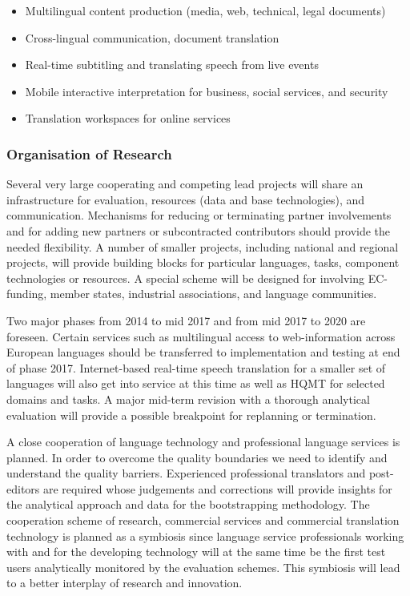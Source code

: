 \documentclass[10pt, plain]{../../metanetpaper}
\begin{document}
\begin{multicols}{2}
\begin{itemize}
\item Multilingual content production (media, web, technical, legal documents)
\item Cross-lingual communication, document translation
\item Real-time subtitling and translating speech from live events
\item Mobile interactive interpretation for business, social services, and security
\item Translation workspaces for online services
\end{itemize}

\subsubsection{Organisation of Research}
\label{sec:organ-rese-pt1}

Several very large cooperating and competing lead projects will share an infrastructure for evaluation, resources (data and base technologies), and communication. Mechanisms for reducing or terminating partner involvements and for adding new partners or subcontracted contributors should provide the needed flexibility. A number of smaller projects, including national and regional projects, will provide building blocks for particular languages, tasks, component technologies or resources. A special scheme will be designed for involving EC-funding, member states, industrial associations, and language communities.
 
Two major phases from 2014 to mid 2017 and from mid 2017 to 2020 are foreseen. Certain services such as multilingual access to web-information across European languages should be transferred to implementation and testing at end of phase 2017. Internet-based real-time speech translation for a smaller set of languages will also get into service at this time as well as HQMT for selected domains and tasks. A major mid-term revision with a thorough analytical evaluation will provide a possible breakpoint for replanning or termination.
 
A close cooperation of language technology and professional language services is planned. In order to overcome the quality boundaries we need to identify and understand the quality barriers. Experienced professional translators and post-editors are required whose judgements and corrections will provide insights for the analytical approach and data for the bootstrapping methodology. The cooperation scheme of research, commercial services and commercial translation technology is planned as a symbiosis since language service professionals working with and for the developing technology will at the same time be the first test users analytically monitored by the evaluation schemes. This symbiosis will lead to a better interplay of research and innovation.
 

\end{multicols}
\end{document}
